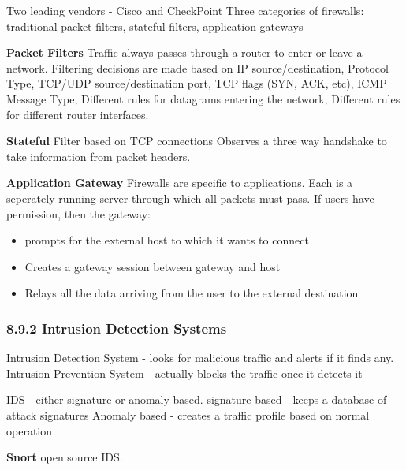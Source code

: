 \documentclass[11pt]{article}
\begin{document}
Two leading vendors - Cisco and CheckPoint
Three categories of firewalls: traditional packet filters, stateful filters, application gateways

\textbf{Packet Filters}
Traffic always passes through a router to enter or leave a network.
Filtering decisions are made based on IP source/destination, Protocol Type, TCP/UDP source/destination port, TCP flags  (SYN, ACK, etc), ICMP Message Type, Different rules for datagrams entering the network, Different rules for different router interfaces.

\textbf{Stateful}
Filter based on TCP connections
Observes a three way handshake to take information from packet headers. 

\textbf{Application Gateway}
Firewalls are specific to applications. Each is a seperately running server through which all packets must pass.
If users have permission, then the gateway:
\begin{itemize}
\item prompts for the external host to which it wants to connect
\item Creates a gateway session between gateway and host
\item Relays all the data arriving from the user to the external destination
\end{itemize}


\subsubsection{8.9.2 Intrusion Detection Systems}
\label{sec:org2bfac26}
Intrusion Detection System - looks for malicious traffic and alerts if it finds any.
Intrusion Prevention System - actually blocks the traffic once it detects it

IDS - either signature or anomaly based.
signature based - keeps a database of attack signatures
Anomaly based - creates a traffic profile based on normal operation


\textbf{Snort}
open source IDS.
\end{document}
